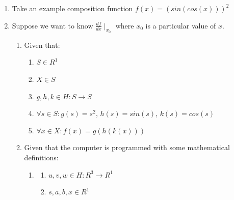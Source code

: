 \documentclass[preprint,12pt]{elsarticle}
\begin{document}
\begin{enumerate}
\item Take an example composition function $f(x) = (sin(cos(x)))^2$\\

\item Suppose we want to know $\frac{df}{dx} \mid_{x_0}$ where $x_0$ is a particular value of $x$. \\

\begin{enumerate}
\item Given that: \\
\label{given}
\begin{enumerate}
\item $S \in R^1$ 
\item $X \in S$ 
\item $g, h, k \in H: S \rightarrow S$ 
\item $\forall s \in S : g(s) = {s}^2$, $h(s) = sin(s)$, $k(s) = cos(s)$ 
\item
\label{composition}
$\forall x \in X : f(x) = g(h(k(x)))$ \\
\end{enumerate}

\item Given that the computer is programmed with some mathematical definitions:\\
\begin{enumerate}
\item
\begin{enumerate}
\item
$u, v, w \in H: R^3 \rightarrow R^1$ \\
\item
$s,a,b,x \in R^1$\\
\end{enumerate}


\end{enumerate}
\end{enumerate}
\end{enumerate}
\end{document}
